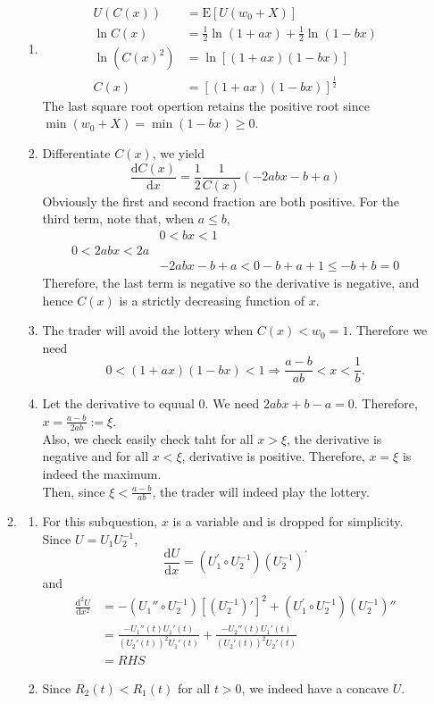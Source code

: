 \documentclass[12pt]{article}
\newcommand{\diff}{\mathrm{d}}
\newcommand{\expec}{\mathrm{E}}
\theoremstyle{definition}
\begin{document}
\begin{enumerate}
\begin{enumerate}
\begin{enumerate}
\item 
\begin{align*}
U(C(x))&=\expec[U(w_0+X)]\\
\ln C(x)&=\frac{1}{2}\ln(1+ax)+\frac{1}{2}\ln(1-bx)\\
\ln(C(x)^2) &= \ln[(1+ax)(1-bx)]\\
C(x)&=[(1+ax)(1-bx)]^\frac{1}{2}
\end{align*}
The last square root opertion retains the positive root since $\min(w_0+X)=\min(1-bx)\geq 0$.
\item Differentiate $C(x)$, we yield
\[
\frac{\diff C(x)}{\diff x}=\frac{1}{2}\frac{1}{C(x)}(-2abx-b+a)
\]
Obviously the first and second fraction are both positive. For the third term, note that, when $a\leq b$,
\begin{align*}
&0<bx<1\\
0<2abx<2a\\
&-2abx-b+a<0-b+a+1\leq -b+b=0
\end{align*}
Therefore, the last term is negative so the derivative is negative, and hence $C(x)$ is a strictly decreasing function of $x$.
\item The trader will avoid the lottery when $C(x)<w_0=1$. Therefore we need
\[
0<(1+ax)(1-bx)<1\Rightarrow \frac{a-b}{ab}<x<\frac{1}{b}.
\]
\item Let the derivative to equual 0. We need $2abx+b-a=0$. Therefore, $x=\frac{a-b}{2ab}:=\xi$.\\
Also, we check easily check taht for all $x>\xi$, the derivative is negative and for all $x<\xi$, derivative is positive. Therefore, $x=\xi$ is indeed the maximum.\\
Then, since $\xi<\frac{a-b}{ab}$, the trader will indeed play the lottery.
\end{enumerate}
\item \begin{enumerate}
\item For this subquestion, $x$ is a variable and is dropped for simplicity. Since $U=U_1U_2^{-1}$, 
\[
\frac{\diff U}{\diff x}=(U_1^\prime\circ U_2^{-1})(U_2^{-1})^\prime
\]
and
\begin{align*}
\frac{\diff^2U}{\diff x^2}&=-(U_1''\circ U_2^{-1})[(U_2^{-1})']^2+(U_1^\prime\circ U_2^{-1})(U_2^{-1})''\\
&=\frac{-U_1''(t)U_1'(t)}{(U_2'(t))^2U_1'(t)}+\frac{-U_2''(t)U_1'(t)}{(U_2'(t))^2U_2'(t)}\\
&=RHS
\end{align*}
\item Since $R_2(t)<R_1(t)$ for all $t>0$, we indeed have a concave $U$.

\end{enumerate}
\end{enumerate}
\end{enumerate}
\end{document}
